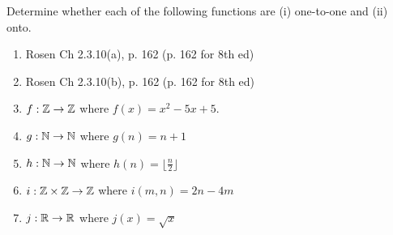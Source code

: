 



 Determine whether each of the following functions are (i) one-to-one and (ii) onto. 
\begin{enumerate}[label=(\alph*),itemsep=0pt,parsep=0pt,topsep=0pt,partopsep=0pt]
    \item {} 
        Rosen Ch 2.3.10(a), p. 162 (p. 162 for 8th ed)
    \item {}
        Rosen Ch 2.3.10(b), p. 162 (p. 162 for 8th ed)
    \item {}
    	$f: \mathbb{Z} \rightarrow \mathbb{Z}$ where $f(x) = x^2 - 5x + 5$.
    \item {}
    	$g: \mathbb{N} \rightarrow \mathbb{N}$ where $g(n) = n+1$
    \item {}
    	$h: \mathbb{N} \rightarrow \mathbb{N}$ where $h(n) = \lfloor \frac{n}{2} \rfloor$
    \item {}
    	$i: \mathbb{Z} \times \mathbb{Z} \rightarrow \mathbb{Z}$ where $i(m,n) = 2n - 4m$
    \item {}
    	$j: \mathbb{R} \rightarrow \mathbb{R}$ where $j(x) = \sqrt{x}$
\end{enumerate}




